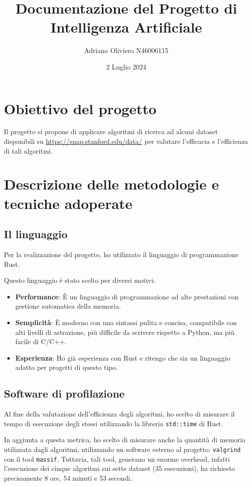 \documentclass{article}
\title{Documentazione del Progetto di Intelligenza Artificiale}
\author{Adriano Oliviero N46006115}
\date{2 Luglio 2024}
\begin{document}
\maketitle

\newpage
\tableofcontents
\newpage
\section{Obiettivo del progetto}
Il progetto si propone di applicare algoritmi di ricerca ad alcuni dataset disponibili su
\url{https://snap.stanford.edu/data/} per valutare l'efficacia e l'efficienza di tali algoritmi.

\section{Descrizione delle metodologie e tecniche adoperate}
\subsection{Il linguaggio}
Per la realizzazione del progetto, ho utilizzato il linguaggio di programmazione Rust.

Questo linguaggio è stato scelto per diversi motivi:
\begin{itemize}
	\item \textbf{Performance}: È un linguaggio di programmazione ad alte prestazioni con gestione automatica della memoria.
	\item \textbf{Semplicità}: È moderno con una sintassi pulita e concisa, compatibile con alti livelli di astrazione, più difficile da scrivere rispetto a Python, ma più facile di C/C++.
	\item \textbf{Esperienza}: Ho già esperienza con Rust e ritengo che sia un linguaggio adatto per progetti di questo tipo.
\end{itemize}

\subsection{Software di profilazione}
Al fine della valutazione dell'efficienza degli algoritmi, ho scelto di misurare il tempo di esecuzione degli stessi
utilizzando la libreria \texttt{std::time} di Rust.

In aggiunta a questa metrica, ho scelto di misurare anche la quantità
di memoria utilizzata dagli algoritmi, utilizzando un software esterno al progetto: \texttt{valgrind} con il tool \texttt{massif}.
Tuttavia, tali tool, generano un enorme overhead, infatti l'esecuzione dei cinque algoritmi sui sette dataset (35 esecuzioni),
ha richiesto precisamente 8 ore, 54 minuti e 53 secondi.
\end{document}
